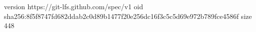 version https://git-lfs.github.com/spec/v1
oid sha256:8f5f8747fd682ddab2c0d89b1477f20e256dc16f3c5c5d69e972b789fce4586f
size 448
